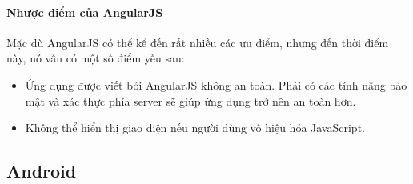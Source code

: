 \documentclass[a4paper]{article}
\begin{document}
\paragraph*{Nhược điểm của AngularJS}
Mặc dù AngularJS có thể kể đến rất nhiều các ưu điểm, nhưng đến thời điểm này, nó vẫn có một số điểm yếu sau:
\begin{itemize}
	\item Ứng dụng được viết bởi AngularJS không an toàn. Phải có các tính năng bảo mật và xác thực phía server sẽ giúp ứng dụng trở nên an toàn hơn.

	\item Không thể hiển thị giao diện nếu người dùng vô hiệu hóa JavaScript.
\end{itemize}

\subsection{Android}
\end{document}
